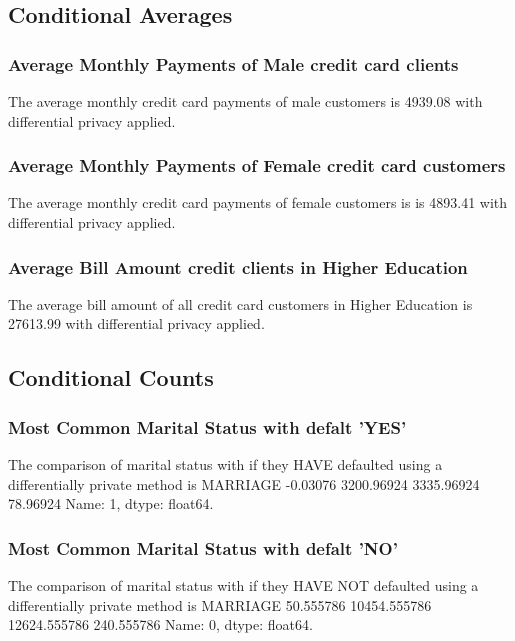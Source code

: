 \documentclass{article}%
\begin{document}
%
\subsection{Conditional Averages}%
\label{subsec:ConditionalAverages}%
\subsubsection{Average Monthly Payments of Male credit card clients}%
\label{ssubsec:AverageMonthlyPaymentsofMalecreditcardclients}%
The average monthly credit card payments of male customers is 4939.08 with differential privacy applied.

%
\subsubsection{Average Monthly Payments of Female credit card customers}%
\label{ssubsec:AverageMonthlyPaymentsofFemalecreditcardcustomers}%
The average monthly credit card payments of female customers is is 4893.41 with differential privacy applied.

%
\subsubsection{Average Bill Amount credit clients in Higher Education}%
\label{ssubsec:AverageBillAmountcreditclientsinHigherEducation}%
The average bill amount of all credit card customers in Higher Education is 27613.99 with differential privacy applied.

%
\subsection{Conditional Counts}%
\label{subsec:ConditionalCounts}%
\subsubsection{Most Common Marital Status with defalt 'YES'}%
\label{ssubsec:MostCommonMaritalStatuswithdefaltYES}%
The comparison of marital status with if they HAVE defaulted using a differentially private method is MARRIAGE      {-}0.03076    3200.96924    3335.96924      78.96924\newline%
Name: 1, dtype: float64.

%
\subsubsection{Most Common Marital Status with defalt 'NO'}%
\label{ssubsec:MostCommonMaritalStatuswithdefaltNO}%
The comparison of marital status with if they HAVE NOT defaulted using a differentially private method is MARRIAGE       50.555786    10454.555786    12624.555786      240.555786\newline%
Name: 0, dtype: float64.

%
\end{document}
